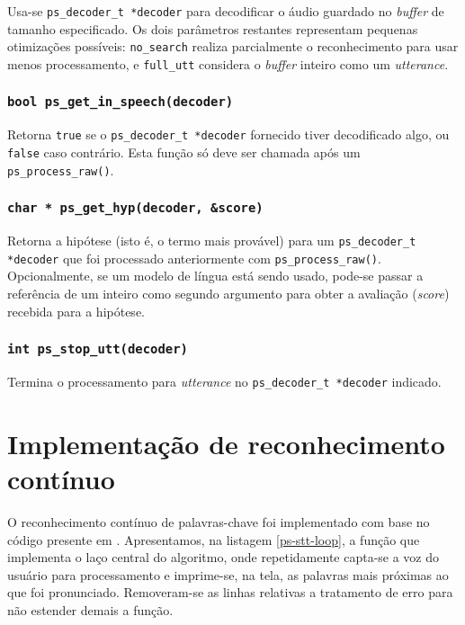 Usa-se \texttt{ps\_decoder\_t *decoder} para decodificar o áudio guardado no \textit{buffer} de tamanho especificado. Os dois parâmetros restantes representam pequenas otimizações possíveis: \texttt{no\_search} realiza parcialmente o reconhecimento para usar menos processamento, e \texttt{full\_utt} considera o \textit{buffer} inteiro como um \textit{utterance}.

\subsubsection{\texttt{bool ps\_get\_in\_speech(decoder)}}

Retorna \texttt{true} se o \texttt{ps\_decoder\_t *decoder} fornecido tiver decodificado algo, ou \texttt{false} caso contrário. Esta função só deve ser chamada após um \texttt{ps\_process\_raw()}.

\subsubsection{\texttt{char * ps\_get\_hyp(decoder, \&score)}}

Retorna a hipótese (isto é, o termo mais provável) para um \texttt{ps\_decoder\_t *decoder} que foi processado anteriormente com \texttt{ps\_process\_raw()}. Opcionalmente, se um modelo de língua está sendo usado, pode-se passar a referência de um inteiro como segundo argumento para obter a avaliação (\textit{score}) recebida para a hipótese.

\subsubsection{\texttt{int ps\_stop\_utt(decoder)}}
Termina o processamento para \textit{utterance} no \texttt{ps\_decoder\_t *decoder} indicado.


\section{Implementação de reconhecimento contínuo}
\label{stt-continuous-algorithm}

O reconhecimento contínuo de palavras-chave foi implementado com base no código presente em \citep{pocketsphinxMicLoop}. Apresentamos, na listagem \ref{ps-stt-loop}, a função que implementa o laço central do algoritmo, onde repetidamente capta-se a voz do usuário para processamento e imprime-se, na tela, as palavras mais próximas ao que foi pronunciado. Removeram-se as linhas relativas a tratamento de erro para não estender demais a função.

